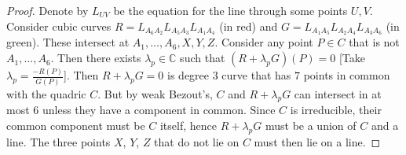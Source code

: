 \documentclass[12pt]{article}
\newcommand{\C}{\mathbb{C}}
\begin{document}
    \begin{proof}
        Denote by $L_{UV}$ be the equation for the line through some points $U, V$. Consider cubic curves $R = L_{A_6A_2}L_{A_5A_3}L_{A_1A_4}$ (in red) and $G = L_{A_1A_5}L_{A_2A_4}L_{A_3A_6}$ (in green). These intersect at $A_1, \dots, A_6, X, Y, Z$. Consider any point $P \in C$ that is not $A_1, \dots, A_6$. Then there exists $\lambda_p \in \C$ such that $(R + \lambda_p G)(P) = 0$ [Take $\lambda_p = \frac{-R(P)}{G(P)}$]. Then $R + \lambda_p G = 0$ is degree $3$ curve that has $7$ points in common with the quadric $C$. But by weak Bezout's, $C$ and $R + \lambda_p G$ can intersect in at most $6$ unless they have a component in common. Since $C$ is irreducible, their common component must be $C$ itself, hence $R + \lambda_p G$ must be a union of $C$ and a line. The three points $X$, $Y$, $Z$ that do not lie on $C$ must then lie on a line.
    \end{proof}
\end{document}
